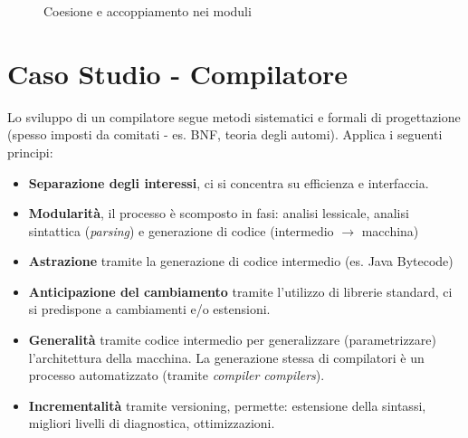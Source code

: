 \begin{figure}[H]
  \centering
  \hfill
  \caption{Coesione e accoppiamento nei moduli}
\end{figure}

\section{Caso Studio - Compilatore}

Lo sviluppo di un compilatore segue metodi sistematici e formali di progettazione (spesso imposti da comitati - es. BNF, teoria degli automi). Applica i seguenti principi:
\begin{itemize}
    \item \textbf{Separazione degli interessi}, ci si concentra su efficienza e interfaccia.
    \item \textbf{Modularità}, il processo è scomposto in fasi: analisi lessicale, analisi sintattica (\textit{parsing}) e generazione di codice (intermedio $\rightarrow$ macchina)
    \item \textbf{Astrazione} tramite la generazione di codice intermedio (es. Java Bytecode)
    \item \textbf{Anticipazione del cambiamento} tramite l'utilizzo di librerie standard, ci si predispone a cambiamenti e/o estensioni.
    \item \textbf{Generalità} tramite codice intermedio per generalizzare (parametrizzare) l'architettura della macchina. La generazione stessa di compilatori è un processo automatizzato (tramite \textit{compiler compilers}).
    \item \textbf{Incrementalità} tramite versioning, permette: estensione della sintassi, migliori livelli di diagnostica, ottimizzazioni.
\end{itemize}

